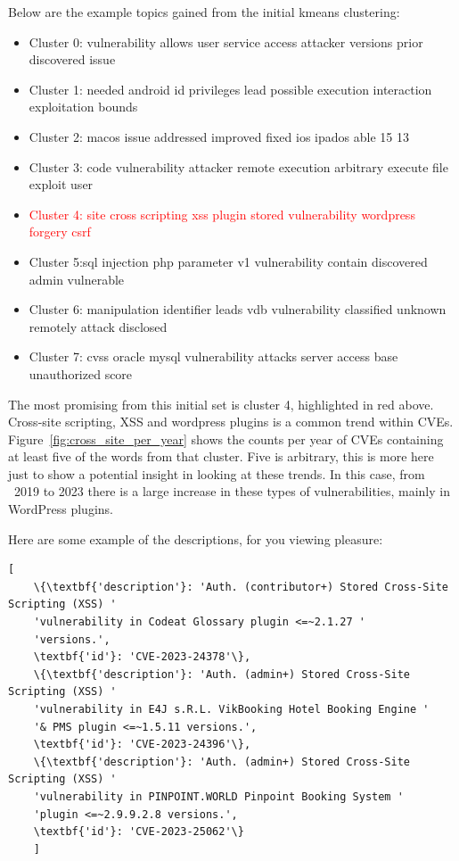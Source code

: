 \documentclass[12pt]{article}
\begin{document}
Below are the example topics gained from the initial kmeans clustering:
\begin{itemize}

	\item Cluster 0: vulnerability allows user service access attacker versions prior discovered issue

	\item Cluster 1: needed android id privileges lead possible execution interaction exploitation bounds

	\item Cluster 2: macos issue addressed improved fixed ios ipados able 15 13

	\item Cluster 3: code vulnerability attacker remote execution arbitrary execute file exploit user

	\item \textcolor{red}{Cluster 4: site cross scripting xss plugin stored vulnerability wordpress
		      forgery csrf}

	\item Cluster 5:sql injection php parameter v1 vulnerability contain discovered
	      admin vulnerable

	\item Cluster 6: manipulation identifier leads vdb vulnerability classified unknown remotely attack disclosed

	\item Cluster 7: cvss oracle mysql vulnerability attacks server access base unauthorized score
\end{itemize}

The most promising from this initial set is cluster 4, highlighted in red above. Cross-site
scripting, XSS and wordpress plugins is a common trend within CVEs.
Figure~\ref{fig:cross_site_per_year} shows the counts per year of CVEs containing at least five of the
words from that cluster. Five is arbitrary, this is more here just to show a potential insight in
looking at these trends. In this case, from ~2019 to 2023 there is a large increase in these types
of vulnerabilities, mainly in WordPress plugins.

Here are some example of the descriptions, for you viewing pleasure:

\begin{Verbatim}[breaklines=true, breakanywhere=true, commandchars=\\\{\}]
	[
	\{\textbf{'description'}: 'Auth. (contributor+) Stored Cross-Site Scripting (XSS) '
	'vulnerability in Codeat Glossary plugin <=~2.1.27 '
	'versions.',
	\textbf{'id'}: 'CVE-2023-24378'\},
	\{\textbf{'description'}: 'Auth. (admin+) Stored Cross-Site Scripting (XSS) '
	'vulnerability in E4J s.R.L. VikBooking Hotel Booking Engine '
	'& PMS plugin <=~1.5.11 versions.',
	\textbf{'id'}: 'CVE-2023-24396'\},
	\{\textbf{'description'}: 'Auth. (admin+) Stored Cross-Site Scripting (XSS) '
	'vulnerability in PINPOINT.WORLD Pinpoint Booking System '
	'plugin <=~2.9.9.2.8 versions.',
	\textbf{'id'}: 'CVE-2023-25062'\}
	]
\end{Verbatim}
\end{document}
